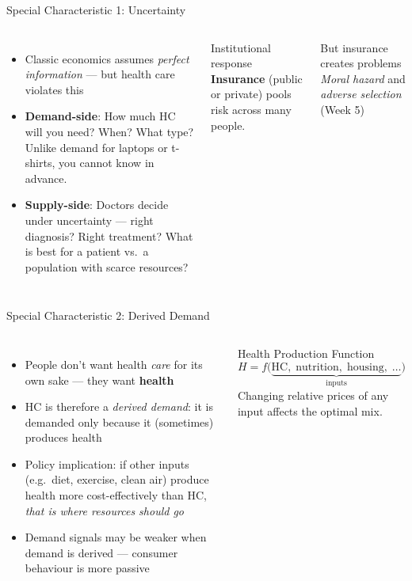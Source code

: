 \documentclass[aspectratio=169, 12pt]{beamer}
\begin{document}
\begin{frame}{Special Characteristic 1: Uncertainty}
	\begin{columns}
		{\small\begin{itemize}\setlength{\itemsep}{0.2em}
			\item Classic economics assumes \emph{perfect information} --- but health care violates this
			\item \textbf{Demand-side}: How much HC will you need? When? What type?
			Unlike demand for laptops or t-shirts, you cannot know in advance.
			\item \textbf{Supply-side}: Doctors decide under uncertainty --- right diagnosis? Right treatment? What is best for a patient vs.\ a population with scarce resources?
		\end{itemize}}
		\begin{block}{Institutional response}
			{\small\textbf{Insurance} (public or private) pools risk across many people.}
		\end{block}
		\vspace{0.3em}
		\begin{alertblock}{But insurance creates problems}
			{\small\textit{Moral hazard} and \textit{adverse selection} (Week 5)}
		\end{alertblock}
	\end{columns}
\end{frame}

\begin{frame}{Special Characteristic 2: Derived Demand}
	\begin{columns}
		\column{0.55\textwidth}
		\begin{itemize}
			\item People don't want health \emph{care} for its own sake --- they want \textbf{health}
			\item HC is therefore a \textit{derived demand}: it is demanded only because it (sometimes)
			produces health
			\item Policy implication: if other inputs (e.g.\ diet, exercise, clean air) produce health
			more cost-effectively than HC, \emph{that is where resources should go}
			\item Demand signals may be weaker when demand is derived --- consumer behaviour is more
			passive
		\end{itemize}
		\column{0.42\textwidth}
		\begin{block}{Health Production Function}
			{\small$$H = f\bigl(\underbrace{\text{HC},\; \text{nutrition},\; \text{housing},\; \ldots}_{\text{inputs}}\bigr)$$}
			\vspace{0.2em}
			{\small Changing relative prices of any input affects the optimal mix.}
		\end{block}
	\end{columns}
\end{frame}
\end{document}
